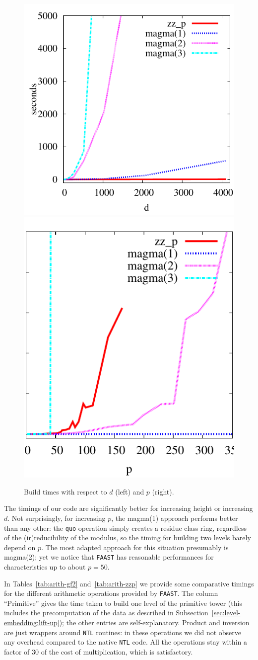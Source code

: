 \begin{figure}
  \centering
  \includegraphics[height=0.5\textwidth]{artin/build-d}
  \includegraphics[height=0.5\textwidth]{artin/build-p}
  
  \caption{Build times with respect to $d$ (left) and $p$ (right).}
  \label{fig:p-d}
\end{figure}

The timings of our code are significantly better for increasing height
or increasing $d$. Not surprisingly, for increasing $p$, the magma(1)
approach performs better than any other: the \texttt{quo} operation
simply creates a residue class ring, regardless of the
(ir)reducibility of the modulus, so the timing for building two levels
barely depend on $p$. The most adapted approach for this situation
presumably is magma(2); yet we notice that \texttt{FAAST} has
reasonable performances for characteristics up to about $p=50$.

In Tables~\ref{tab:arith-gf2} and~\ref{tab:arith-zzp} we provide some
comparative timings for the different arithmetic operations provided
by \texttt{FAAST}. The column ``Primitive'' gives the time taken to
build one level of the primitive tower (this includes the
precomputation of the data as described in
Subsection~\ref{sec:level-embedding:lift-up}); the other entries are
self-explanatory. Product and inversion are just wrappers around
\texttt{NTL} routines: in these operations we did not observe any
overhead compared to the native \texttt{NTL} code. All the operations
stay within a factor of $30$ of the cost of multiplication, which is
satisfactory.

